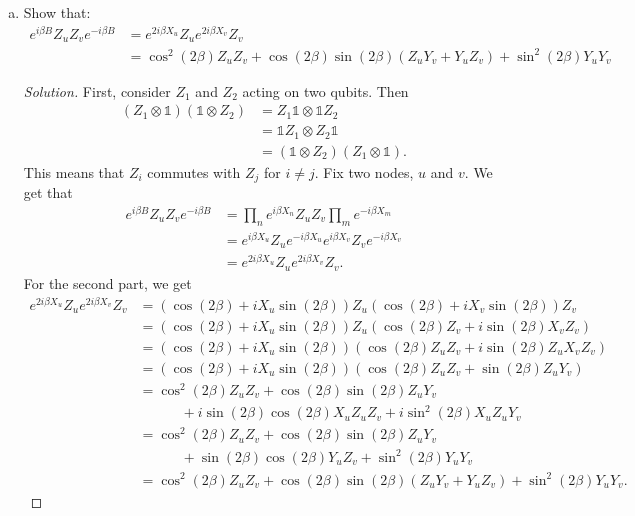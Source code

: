 \documentclass[11pt]{article}
\newenvironment{question}[2][Question]{\begin{trivlist}
\item[\hskip \labelsep {\bfseries #1}\hskip \labelsep {\bfseries #2.}]}{\end{trivlist}}
\newenvironment{solution}{\begin{proof}[Solution]}{\end{proof}}
\newcommand{\lr}[3]{\!\left#1 #3 \right#2}
\begin{document}
\begin{question}{2}
\begin{enumerate}[(a)]
            \item
            Show that:
            \begin{align*}
                e^{i\beta B}Z_uZ_ve^{-i\beta B} &= e^{2i\beta X_u}Z_ue^{2i\beta X_v}Z_v \\
                &= \cos^2(2\beta)Z_uZ_v+\cos(2\beta)\sin(2\beta)(Z_uY_v+Y_uZ_v)+\sin^2(2\beta)Y_uY_v
            \end{align*}
            \begin{solution}
                First, consider $Z_1$ and $Z_2$ acting on two qubits. Then 
                \begin{align*}
                    (Z_1\otimes\mathds{1})(\mathds{1}\otimes Z_2) &= Z_1\mathds{1} \otimes \mathds{1}Z_2 \\
                    &= \mathds{1}Z_1 \otimes Z_2\mathds{1} \\
                    &= (\mathds{1}\otimes Z_2) (Z_1\otimes\mathds{1}).
                \end{align*}
                This means that $Z_i$ commutes with $Z_j$ for $i\neq j$. Fix two nodes, $u$ and $v$. We get that
                \begin{align*}
                    e^{i\beta B}Z_uZ_ve^{-i\beta B} &= \prod_ne^{i\beta X_n}Z_uZ_v\prod_m e^{-i\beta X_m} \\
                    &= e^{i\beta X_u}Z_ue^{-i\beta X_u}e^{i\beta X_v}Z_ve^{-i\beta X_v} \\
                    &= e^{2i\beta X_u}Z_ue^{2i\beta X_v}Z_v.
                \end{align*}
                For the second part, we get
                \begin{align*}
                    e^{2i\beta X_u}Z_ue^{2i\beta X_v}Z_v &= \lr(){\cos(2\beta)+iX_u\sin(2\beta)}Z_u\lr(){\cos(2\beta)+iX_v\sin(2\beta)}Z_v \\
                    &= \lr(){\cos(2\beta)+iX_u\sin(2\beta)}Z_u\lr(){\cos(2\beta)Z_v+i\sin(2\beta)X_vZ_v} \\
                    &= \lr(){\cos(2\beta)+iX_u\sin(2\beta)}\lr(){\cos(2\beta)Z_uZ_v+i\sin(2\beta)Z_uX_vZ_v} \\
                    &= \lr(){\cos(2\beta)+iX_u\sin(2\beta)}\lr(){\cos(2\beta)Z_uZ_v+\sin(2\beta)Z_uY_v} \\ 
                    &= \cos^2(2\beta)Z_uZ_v+\cos(2\beta)\sin(2\beta)Z_uY_v \\
                    &\quad\quad\quad +i\sin(2\beta)\cos(2\beta)X_uZ_uZ_v+i\sin^2(2\beta)X_uZ_uY_v \\
                    &= \cos^2(2\beta)Z_uZ_v+\cos(2\beta)\sin(2\beta)Z_uY_v \\
                    &\quad\quad\quad+\sin(2\beta)\cos(2\beta)Y_uZ_v+\sin^2(2\beta)Y_uY_v \\
                    &= \cos^2(2\beta)Z_uZ_v+\cos(2\beta)\sin(2\beta)(Z_uY_v+Y_uZ_v)+\sin^2(2\beta)Y_uY_v.
                \end{align*}
            \end{solution}


\end{enumerate}
\end{question}
\end{document}
